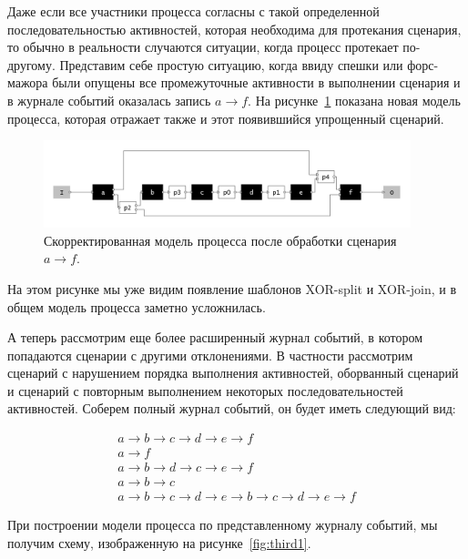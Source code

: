 \documentclass[
11pt,%
tightenlines,%
twoside,%
onecolumn,%
nofloats,%
nobibnotes,%
nofootinbib,%
superscriptaddress,%
noshowpacs,%
centertags]%
{revtex4}
\begin{document}
Даже если все участники процесса согласны с такой определенной последовательностью активностей, которая необходима для протекания сценария, то обычно в реальности случаются ситуации, когда процесс протекает по-другому.
Представим себе простую ситуацию, когда ввиду спешки или форс-мажора были опущены все промежуточные активности в выполнении сценария и в журнале событий оказалась запись $a \rightarrow f$.
На рисунке~\ref{fig:second1} показана новая модель процесса, которая отражает также и этот появившийся упрощенный сценарий.

\begin{figure}[h]
\setcaptionmargin{5mm}
\includegraphics[width=0.95\textwidth]{pics/second1.png}
\caption{Скорректированная модель процесса после обработки сценария $a \rightarrow f$.}
\label{fig:second1}
\end{figure}

На этом рисунке мы уже видим появление шаблонов XOR-split и XOR-join, и в общем модель процесса заметно усложнилась.

А теперь рассмотрим еще более расширенный журнал событий, в котором попадаются сценарии с другими отклонениями.
В частности рассмотрим сценарий с нарушением порядка выполнения активностей, оборванный сценарий и сценарий с повторным выполнением некоторых последовательностей активностей.
Соберем полный журнал событий, он будет иметь следующий вид:

\begin{eqnarray*}
a \rightarrow b \rightarrow c \rightarrow d \rightarrow e \rightarrow f \\
a \rightarrow f \\
a \rightarrow b \rightarrow d \rightarrow c \rightarrow e \rightarrow f \\
a \rightarrow b \rightarrow c \\
a \rightarrow b \rightarrow c \rightarrow d \rightarrow e \rightarrow b \rightarrow c \rightarrow d \rightarrow e \rightarrow f
\end{eqnarray*}

При построении модели процесса по представленному журналу событий, мы получим схему, изображенную на рисунке~\ref{fig:third1}.
\end{document}
